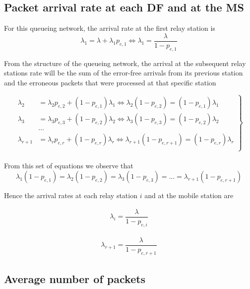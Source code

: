 \subsection{Packet arrival rate at each DF and at the MS}

For this queueing network, the arrival rate at the first relay station is
$$\lambda_1 = \lambda + \lambda_1 p_{e,1} \Leftrightarrow \lambda_1 = \dfrac{\lambda}{1 - p_{e,1}}$$

From the structure of the queueing network, the arrival at the subsequent relay
stations rate will be the sum of the error-free arrivals from its previous
station and the erroneous packets that were processed at that specific station

\begin{equation}
 \left.
  \begin{array}{rl}
    \lambda_2 &= \lambda_2 p_{e,2} + (1 - p_{e,1}) \lambda_1 \Leftrightarrow
    \lambda_2 (1 - p_{e,2}) = (1 - p_{e,1}) \lambda_1 \\
    \lambda_3 &= \lambda_3 p_{e,3} + (1 - p_{e,2}) \lambda_2 \Leftrightarrow
    \lambda_3 (1 - p_{e,3}) = (1 - p_{e,2}) \lambda_2 \\
    & \dots \\
    \lambda_{r+1} &= \lambda_r p_{e,r} + (1 - p_{e,r}) \lambda_r \Leftrightarrow
    \lambda_{r+1} (1 - p_{e,r+1}) = (1 - p_{e,r}) \lambda_r \\
  \end{array}
\right\} \label{eq:03_1}
\end{equation} \\

From this set of equations we observe that
$$\lambda_1 (1-p_{e,1}) = \lambda_2 (1-p_{e,2}) = \lambda_3 (1-p_{e,3})
= \dots = \lambda_{r+1} (1 - p_{e,r+1})$$

Hence the arrival rates at each relay station $i$ and at the mobile station are

\begin{align*}
  \lambda_i = \dfrac{\lambda}{1-p_{e,i}}
\end{align*}

\begin{align*}
  \lambda_{r+1} = \dfrac{\lambda}{1-p_{e,r+1}}
\end{align*}


\subsection{Average number of packets}

